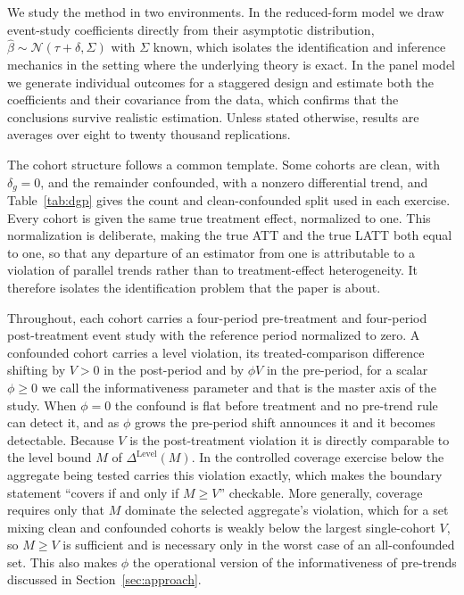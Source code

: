\documentclass[12pt]{article}
\theoremstyle{remark}
\begin{document}
We study the method in two environments. In the reduced-form model we draw event-study
coefficients directly from their asymptotic distribution, $\hat\beta\sim\mathcal{N}(\tau+\delta,\Sigma)$
with $\Sigma$ known, which isolates the identification and inference mechanics in the setting where the
underlying theory is exact. In the panel model we generate individual outcomes for a staggered
design and estimate both the coefficients and their covariance from the data, which confirms that the
conclusions survive realistic estimation. Unless stated otherwise, results are averages over eight to
twenty thousand replications.

The cohort structure follows a common template. Some cohorts are clean, with $\delta_g=0$, and the
remainder confounded, with a nonzero differential trend, and Table~\ref{tab:dgp} gives the count and
clean-confounded split used in each exercise. Every cohort is given the same true treatment effect,
normalized to one. This normalization is deliberate, making
the true ATT and the true LATT both equal to one, so that any departure of an estimator from one is
attributable to a violation of parallel trends rather than to treatment-effect heterogeneity. It
therefore isolates the identification problem that the paper is about.

Throughout, each cohort carries a four-period pre-treatment and four-period post-treatment event study
with the reference period normalized to zero. A confounded cohort carries a level violation, its
treated-comparison difference shifting by $V>0$ in the post-period and by $\phi V$ in the pre-period, for
a scalar $\phi\ge 0$ we call the informativeness parameter and that is the master axis of the study. When
$\phi=0$ the confound is flat before treatment and no pre-trend rule can detect it, and as $\phi$ grows
the pre-period shift announces it and it becomes detectable. Because $V$ is the post-treatment violation it
is directly comparable to the level bound $M$ of $\Delta^{\mathrm{Level}}(M)$. In the controlled coverage
exercise below the aggregate being tested carries this violation exactly, which makes the boundary
statement ``covers if and only if $M\ge V$'' checkable. More generally, coverage requires only that $M$
dominate the selected aggregate's violation, which for a set mixing clean and confounded cohorts is weakly
below the largest single-cohort $V$, so $M\ge V$ is sufficient and is necessary only in the worst case of an
all-confounded set. This also makes $\phi$ the operational version of the informativeness of pre-trends
discussed in Section~\ref{sec:approach}.
\end{document}
